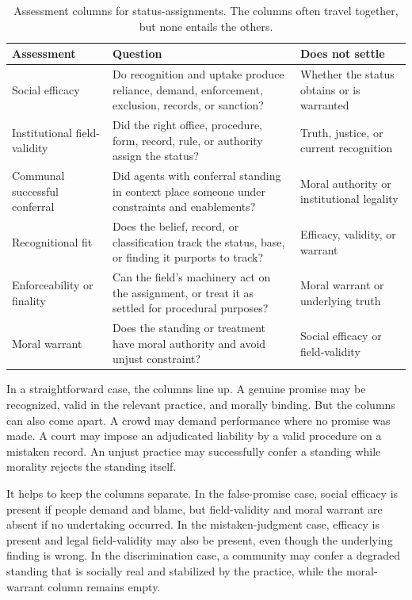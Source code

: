 \documentclass[12pt]{article}
\begin{document}
\begin{table}[H]
\centering
\small
\setlength{\tabcolsep}{3pt}
\begin{tabular}{@{}>{\raggedright\arraybackslash}p{}>{\raggedright\arraybackslash}p{}>{\raggedright\arraybackslash}p{}@{}}
\toprule
Assessment & Question & Does not settle \\
\midrule
Social efficacy & Do recognition and uptake produce reliance, demand, enforcement, exclusion, records, or sanction? & Whether the status obtains or is warranted \\
Institutional field-validity & Did the right office, procedure, form, record, rule, or authority assign the status? & Truth, justice, or current recognition \\
Communal successful conferral & Did agents with conferral standing in context place someone under constraints and enablements? & Moral authority or institutional legality \\
Recognitional fit & Does the belief, record, or classification track the status, base, or finding it purports to track? & Efficacy, validity, or warrant \\
Enforceability or finality & Can the field's machinery act on the assignment, or treat it as settled for procedural purposes? & Moral warrant or underlying truth \\
Moral warrant & Does the standing or treatment have moral authority and avoid unjust constraint? & Social efficacy or field-validity \\
\bottomrule
\end{tabular}
\caption{Assessment columns for status-assignments. The columns often travel together, but none entails the others.}
\label{tab:assessment}
\end{table}

In a straightforward case, the columns line up. A genuine promise may be recognized, valid in the relevant practice, and morally binding. But the columns can also come apart. A crowd may demand performance where no promise was made. A court may impose an adjudicated liability by a valid procedure on a mistaken record. An unjust practice may successfully confer a standing while morality rejects the standing itself.

It helps to keep the columns separate. In the false-promise case, social efficacy is present if people demand and blame, but field-validity and moral warrant are absent if no undertaking occurred. In the mistaken-judgment case, efficacy is present and legal field-validity may also be present, even though the underlying finding is wrong. In the discrimination case, a community may confer a degraded standing that is socially real and stabilized by the practice, while the moral-warrant column remains empty.
\end{document}
